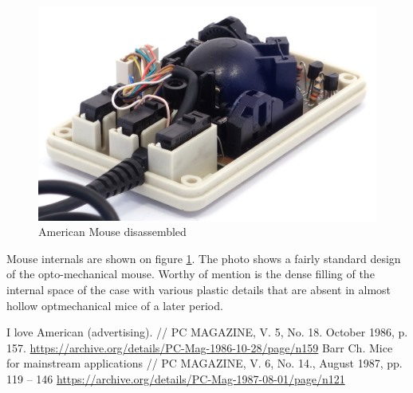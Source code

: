 \documentclass[11pt, a4paper]{article}
\begin{document}
\begin{figure}[h]
    \centering
    \includegraphics[scale=0.9]{1986_american_mouse/inside_60.jpg}
    \caption{American Mouse disassembled}
    \label{fig:AmericanInside}
\end{figure}

Mouse internals are shown on figure \ref{fig:AmericanInside}. The photo shows a fairly standard design of the opto-mechanical mouse. Worthy of mention is the dense filling of the internal space of the case with various plastic details that are absent in almost hollow optmechanical mice of a later period.

\begin{thebibliography}{9}
 I love American (advertising). // PC MAGAZINE, V. 5, No. 18. October 1986, p. 157. \url{https://archive.org/details/PC-Mag-1986-10-28/page/n159}
 Barr Ch. Mice for mainstream applications // PC MAGAZINE, V. 6, No. 14., August 1987, pp. 119 – 146 \url{https://archive.org/details/PC-Mag-1987-08-01/page/n121}
\end{thebibliography}
\end{document}
